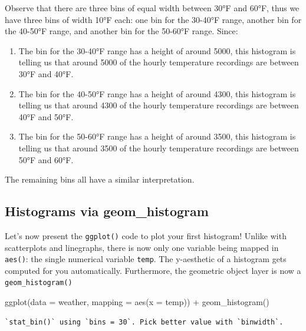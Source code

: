\documentclass[
  letterpaper,
  DIV=11,
  numbers=noendperiod]{scrreprt}
\newenvironment{Shaded}{\begin{snugshade}}{\end{snugshade}}
\newcommand{\AttributeTok}[1]{\textcolor[rgb]{0.40,0.45,0.13}{#1}}
\newcommand{\FunctionTok}[1]{\textcolor[rgb]{0.28,0.35,0.67}{#1}}
\newcommand{\NormalTok}[1]{\textcolor[rgb]{0.00,0.23,0.31}{#1}}
\newcommand{\SpecialCharTok}[1]{\textcolor[rgb]{0.37,0.37,0.37}{#1}}
\providecommand{\tightlist}{%
  \setlength{\itemsep}{0pt}\setlength{\parskip}{0pt}}\usepackage{longtable,booktabs,array}
\theoremstyle{definition}
\theoremstyle{remark}
\begin{document}
Observe that there are three bins of equal width between 30°F and 60°F,
thus we have three bins of width 10°F each: one bin for the 30-40°F
range, another bin for the 40-50°F range, and another bin for the
50-60°F range. Since:

\begin{enumerate}
\def\labelenumi{\arabic{enumi}.}
\tightlist
\item
  The bin for the 30-40°F range has a height of around 5000, this
  histogram is telling us that around 5000 of the hourly temperature
  recordings are between 30°F and 40°F.
\item
  The bin for the 40-50°F range has a height of around 4300, this
  histogram is telling us that around 4300 of the hourly temperature
  recordings are between 40°F and 50°F.
\item
  The bin for the 50-60°F range has a height of around 3500, this
  histogram is telling us that around 3500 of the hourly temperature
  recordings are between 50°F and 60°F.
\end{enumerate}

The remaining bins all have a similar interpretation.

\hypertarget{sec-geomhistogram}{%
\subsection{Histograms via geom\_histogram}\label{sec-geomhistogram}}

Let's now present the \texttt{ggplot()} code to plot your first
histogram! Unlike with scatterplots and linegraphs, there is now only
one variable being mapped in \texttt{aes()}: the single numerical
variable \texttt{temp}. The y-aesthetic of a histogram gets computed for
you automatically. Furthermore, the geometric object layer is now a
\texttt{geom\_histogram()}

\begin{Shaded}
\begin{Highlighting}[]
\FunctionTok{ggplot}\NormalTok{(}\AttributeTok{data =}\NormalTok{ weather, }\AttributeTok{mapping =} \FunctionTok{aes}\NormalTok{(}\AttributeTok{x =}\NormalTok{ temp)) }\SpecialCharTok{+}
  \FunctionTok{geom\_histogram}\NormalTok{()}
\end{Highlighting}
\end{Shaded}

\begin{verbatim}
`stat_bin()` using `bins = 30`. Pick better value with `binwidth`.
\end{verbatim}
\end{document}
